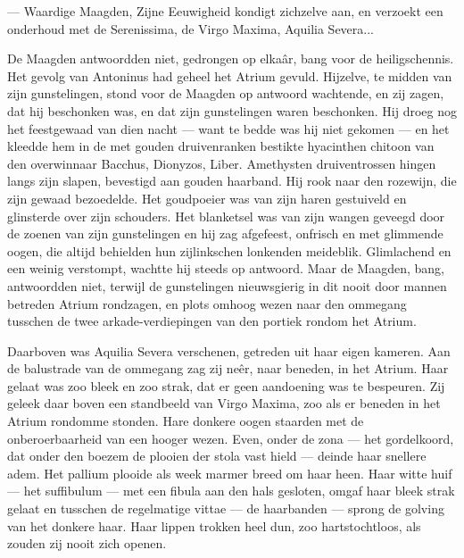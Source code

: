 \documentclass[a4paper, 12pt, oneside, dutch]{article}
\begin{document}
--- Waardige Maagden, Zijne Eeuwigheid kondigt zichzelve aan, en verzoekt een onderhoud met de Serenissima, de Virgo Maxima, Aquilia Severa...

De Maagden antwoordden niet, gedrongen op elkaâr, bang voor de heiligschennis. Het gevolg van Antoninus had geheel het Atrium gevuld. Hijzelve, te midden van zijn gunstelingen, stond voor de Maagden op antwoord wachtende, en zij zagen, dat hij beschonken was, en dat zijn gunstelingen waren beschonken. Hij droeg nog het feestgewaad van dien nacht --- want te bedde was hij niet gekomen --- en het kleedde hem in de met gouden druivenranken bestikte hyacinthen chitoon van den overwinnaar Bacchus, Dionyzos, Liber. Amethysten druiventrossen hingen langs zijn slapen, bevestigd aan gouden haarband. Hij rook naar den rozewijn, die zijn gewaad bezoedelde. Het goudpoeier was van zijn haren gestuiveld en glinsterde over zijn schouders. Het blanketsel was van zijn wangen geveegd door de zoenen van zijn gunstelingen en hij zag afgefeest, onfrisch en met glimmende oogen, die altijd behielden hun zijlinkschen lonkenden meideblik. Glimlachend en een weinig verstompt, wachtte hij steeds op antwoord. Maar de Maagden, bang, antwoordden niet, terwijl de gunstelingen nieuwsgierig in dit nooit door mannen betreden Atrium rondzagen, en plots omhoog wezen naar den ommegang tusschen de twee arkade-verdiepingen van den portiek rondom het Atrium.

Daarboven was Aquilia Severa verschenen, getreden uit haar eigen kameren. Aan de balustrade van de ommegang zag zij neêr, naar beneden, in het Atrium. Haar gelaat was zoo bleek en zoo strak, dat er geen aandoening was te bespeuren. Zij geleek daar boven een standbeeld van Virgo Maxima, zoo als er beneden in het Atrium rondomme stonden. Hare donkere oogen staarden met de onberoerbaarheid van een hooger wezen. Even, onder de zona --- het gordelkoord, dat onder den boezem de plooien der stola vast hield --- deinde haar snellere adem. Het pallium plooide als week marmer breed om haar heen. Haar witte huif --- het suffibulum --- met een fibula aan den hals gesloten, omgaf haar bleek strak gelaat en tusschen de regelmatige vittae --- de haarbanden --- sprong de golving van het donkere haar. Haar lippen trokken heel dun, zoo hartstochtloos, als zouden zij nooit zich openen.
\end{document}
